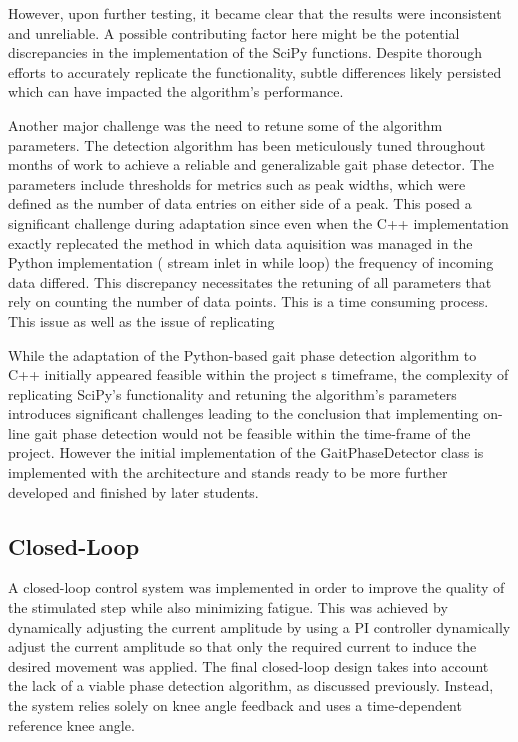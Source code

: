 However, upon further testing, it became clear that the results were inconsistent and unreliable. A possible contributing factor here might be the potential discrepancies in the implementation of the SciPy functions. Despite thorough efforts to accurately replicate the functionality, subtle differences likely persisted which can have impacted the algorithm's performance. 

Another major challenge was the need to retune some of the algorithm parameters. The detection algorithm has been meticulously tuned throughout months of work to achieve a reliable and generalizable gait phase detector. The parameters include thresholds for metrics such as peak widths, which were defined as the number of data entries on either side of a peak. This posed  a significant challenge during adaptation since even when the C++ implementation exactly replecated the method in which data aquisition was managed in the Python implementation ( stream inlet in while loop) the frequency of incoming data differed. This discrepancy necessitates the retuning of all parameters that rely on counting the number of data points. This is a time consuming process. This issue as well as the issue of replicating 

While the adaptation of the Python-based gait phase detection algorithm to C++ initially appeared feasible within the project
s timeframe, the complexity of replicating SciPy's functionality and retuning the algorithm's parameters introduces significant challenges leading to the conclusion that implementing on-line gait phase detection would not be feasible within the time-frame of the project. However the initial implementation of the GaitPhaseDetector class is implemented with the architecture and stands ready to be more further developed and finished by later students.

\subsection{Closed-Loop}
A closed-loop control system was implemented in order to improve the quality of the stimulated step while also minimizing fatigue. This was achieved by dynamically adjusting the current amplitude by using a  PI controller dynamically adjust the current amplitude so that only the required current to induce the desired movement was applied. The final closed-loop design takes into account the lack of a viable phase detection algorithm, as discussed previously. Instead, the system relies solely on knee angle feedback and uses a time-dependent reference knee angle.

